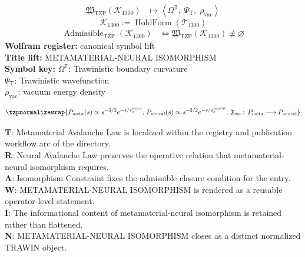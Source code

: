 \noindent
\begin{minipage}[t]{0.48\linewidth}
\begingroup
\small
\[
\begin{aligned}
\mathfrak{W}_{\mathrm{TZP}}\!\left(\mathcal{K}_{1300}\right)
&\longmapsto
\left\langle \Omega^{\mathbb{T}},\; \Psi_{\mathrm{T}},\; \rho_{\mathrm{vac}} \right\rangle
\end{aligned}
\]
\[
\mathcal{K}_{1300}
:=
\operatorname{HoldForm}\!\left(\mathcal{T}_{1300}\right)
\]
\[
\begin{aligned}
\operatorname{Admissible}_{\mathrm{TZP}}\!\left(\mathcal{K}_{1300}\right)
&\Longleftrightarrow
\mathfrak{W}_{\mathrm{TZP}}\!\left(\mathcal{K}_{1300}\right)\not\equiv\varnothing
\end{aligned}
\]
\textbf{Wolfram register:} canonical symbol lift\\
\textbf{Title lift:} METAMATERIAL-NEURAL ISOMORPHISM\\
\textbf{Symbol key:} \(\Omega^{\mathbb{T}}\): Trawinistic boundary curvature\\ \(\Psi_{\mathrm{T}}\): Trawinistic wavefunction\\ \(\rho_{\mathrm{vac}}\): vacuum energy density
\par
\endgroup
\end{minipage}\hfill
\begin{minipage}[t]{0.48\linewidth}
\[
\tzpnormalizewrap{P_{\mathrm{meta}}(s)\propto s^{-3/2}e^{-s/s_{\mathrm{c}}^{\mathrm{meta}}},\,P_{\mathrm{neural}}(s)\propto s^{-3/2}e^{-s/s_{\mathrm{c}}^{\mathrm{neural}}},\,\mathfrak{F}_{\mathrm{iso}}:\,P_{\mathrm{meta}}\longrightarrow P_{\mathrm{neural}}}
\]

\small
\textbf{T}: Metamaterial Avalanche Law is localized within the registry and publication workflow arc of the directory.\\
\textbf{R}: Neural Avalanche Law preserves the operative relation that metamaterial-neural isomorphism requires.\\
\textbf{A}: Isomorphism Constraint fixes the admissible closure condition for the entry.\\
\textbf{W}: METAMATERIAL-NEURAL ISOMORPHISM is rendered as a reusable operator-level statement.\\
\textbf{I}: The informational content of metamaterial-neural isomorphism is retained rather than flattened.\\
\textbf{N}: METAMATERIAL-NEURAL ISOMORPHISM closes as a distinct normalized TRAWIN object.
\normalsize
\end{minipage}

